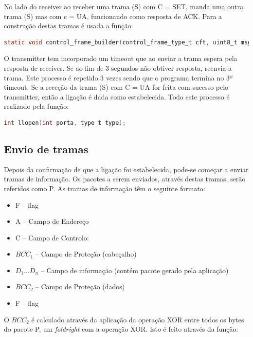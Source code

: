 \documentclass[a4paper,11pt,portuguese]{article}
\begin{document}
    No lado do receiver ao receber uma trama (S) com C = SET, manda uma outra trama (S) mas com c = UA,
    funcionando como resposta de ACK. Para a construção destas tramas é usada a função:
    
\begin{lstlisting}[language=C]
static void control_frame_builder(control_frame_type_t cft, uint8_t msg[]);    
\end{lstlisting}

    O transmitter tem incorporado um timeout que ao enviar a trama espera pela resposta de receiver. Se
    ao fim de 3 segundos não obtiver resposta, reenvia a trama. Este processo é repetido 3 vezes sendo que
    o programa termina no 3º timeout. Se a receção da trama (S) com C = UA for feita com sucesso pelo transmitter, então a ligação é dada
    como estabelecida. Todo este processo é realizado pela função:

\begin{lstlisting}[language=C]
int llopen(int porta, type_t type);    
\end{lstlisting}

    \subsection{Envio de tramas}

    Depois da confirmação de que a ligação foi estabelecida, pode-se começar a enviar tramas de
    informação. Os pacotes a serem enviados, através destas tramas, serão referidos como P. As tramas de 
    informação têm o seguinte formato:

    \begin{itemize}
        \item F -- flag
        \item A -- Campo de Endereço
        \item C -- Campo de Controlo:
        \item $BCC_1$ -- Campo de Proteção (cabeçalho)
        \item $D_1...D_n$ -- Campo de informação (contém pacote gerado pela aplicação)
        \item $BCC_2$ -- Campo de Proteção (dados)
        \item F -- flag
    \end{itemize}

    O $BCC_2$ é calculado através da aplicação da operação XOR entre todos os bytes do pacote P, 
    um \textit{foldright} com a operação XOR. Isto é feito através da função:
\end{document}
